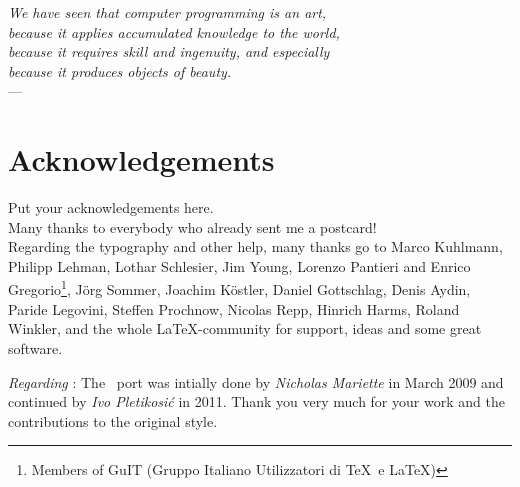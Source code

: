 

\begin{flushright}{\slshape    
We have seen that computer programming is an art, \\ 
because it applies accumulated knowledge to the world, \\ 
because it requires skill and ingenuity, and especially \\
because it produces objects of beauty.} \\ \medskip
--- %
\end{flushright}

\bigskip


\begingroup

\let\clearpage\relax
\let\cleardoublepage\relax
\let\cleardoublepage\relax

\chapter*{Acknowledgements} %

Put your acknowledgements here.\\

\noindent Many thanks to everybody who already sent me a postcard!\\

\noindent Regarding the typography and other help, many thanks go to Marco Kuhlmann, Philipp Lehman, Lothar Schlesier, Jim Young, Lorenzo Pantieri and Enrico Gregorio\footnote{Members of GuIT (Gruppo Italiano Utilizzatori di \TeX\ e \LaTeX )}, J\"org Sommer, Joachim K\"ostler, Daniel Gottschlag, Denis Aydin, Paride Legovini, Steffen Prochnow, Nicolas Repp, Hinrich Harms, Roland Winkler,  and the whole \LaTeX-community for support, ideas and some great software.

\bigskip

\noindent\emph{Regarding \mLyX}: The \mLyX\ port was intially done by
\emph{Nicholas Mariette} in March 2009 and continued by
\emph{Ivo Pletikosi\'c} in 2011. Thank you very much for your work and the contributions to the original style.

\endgroup
